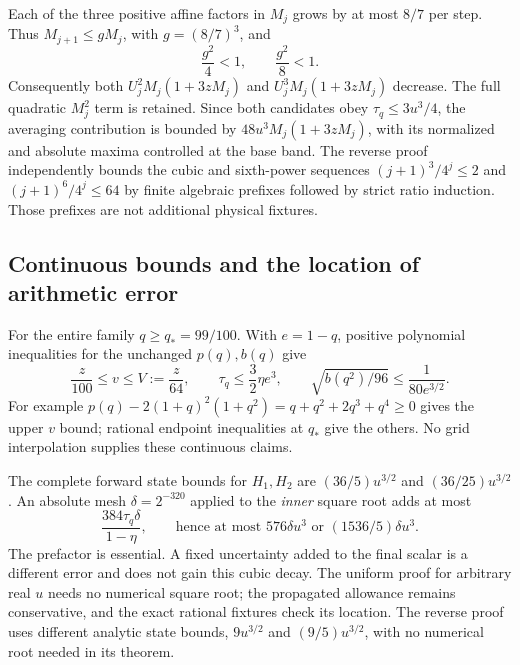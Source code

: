 Each of the three positive affine factors in $M_j$ grows by at most $8/7$ per step. Thus $M_{j+1}\le gM_j$, with $g=(8/7)^3$, and
\begin{equation}
 \frac{g^2}{4}<1,\qquad\frac{g^2}{8}<1.
 \label{r28:eq:ai4-growing-averaging}
\end{equation}
Consequently both $U_j^2M_j(1+3zM_j)$ and $U_j^3M_j(1+3zM_j)$ decrease. The full quadratic $M_j^2$ term is retained. Since both candidates obey $\tau_q\le3u^3/4$, the averaging contribution is bounded by $48u^3M_j(1+3zM_j)$, with its normalized and absolute maxima controlled at the base band. The reverse proof independently bounds the cubic and sixth-power sequences $(j+1)^3/4^j\le2$ and $(j+1)^6/4^j\le64$ by finite algebraic prefixes followed by strict ratio induction. Those prefixes are not additional physical fixtures.

\subsection{Continuous bounds and the location of arithmetic error}
For the entire family $q\ge q_*=99/100$. With $e=1-q$, positive polynomial inequalities for the unchanged $p(q),b(q)$ give
\begin{equation}
 \frac z{100}\le v\le V:=\frac z{64},\qquad
 \tau_q\le\frac32\eta e^3,\qquad
 \sqrt{b(q^2)/96}\le\frac1{80e^{3/2}}.
 \label{r28:eq:ai4-continuous}
\end{equation}
For example $p(q)-2(1+q)^2(1+q^2)=q+q^2+2q^3+q^4\ge0$ gives the upper $v$ bound; rational endpoint inequalities at $q_*$ give the others. No grid interpolation supplies these continuous claims.

The complete forward state bounds for $H_1,H_2$ are $(36/5)u^{3/2}$ and $(36/25)u^{3/2}$. An absolute mesh $\delta=2^{-320}$ applied to the \emph{inner} square root adds at most
\begin{equation}
 \frac{384\tau_q\delta}{1-\eta},\qquad
 \text{hence at most }576\delta u^3\text{ or }(1536/5)\delta u^3.
 \label{r28:eq:ai4-rounding}
\end{equation}
The prefactor is essential. A fixed uncertainty added to the final scalar is a different error and does not gain this cubic decay. The uniform proof for arbitrary real $u$ needs no numerical square root; the propagated allowance remains conservative, and the exact rational fixtures check its location. The reverse proof uses different analytic state bounds, $9u^{3/2}$ and $(9/5)u^{3/2}$, with no numerical root needed in its theorem.

